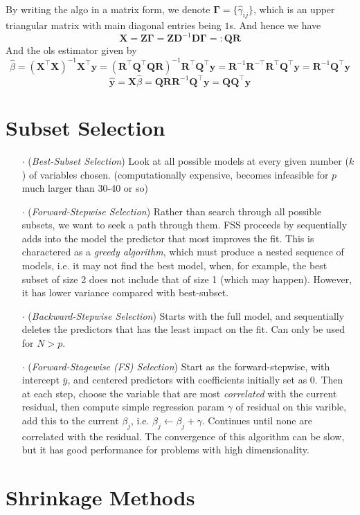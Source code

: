\documentclass[a4paper, 11pt]{article}
\begin{document}
\begin{itemize}
	~\\
	By writing the algo in a matrix form, we denote $\bm{\Gamma}=\{\hat{\gamma}_{ij}\}$, which is an upper triangular matrix with main diagonal entries being $1$s. And hence we have
	$$
	\bm{X} = \bm{Z\Gamma} = \bm{ZD}^{-1} \bm{D\Gamma} =: \bm{QR}
	$$
	And the ols estimator given by
	$$
	\hat{\beta} = (\bm{X}^{\top}\bm{X})^{-1} \bm{X}^{\top} \bm{y} = (\bm{R}^{\top}\bm{Q}^{\top}\bm{QR})^{-1} \bm{R}^{\top} \bm{Q}^{\top} \bm{y} = \bm{R}^{-1} \bm{R}^{-\top} \bm{R}^{\top} \bm{Q}^{\top} \bm{y} = \bm{R}^{-1} \bm{Q}^{\top} \bm{y}
	$$
	$$
	\hat{\bm{y}} = \bm{X}\hat{\beta} = \bm{QR}\bm{R}^{-1} \bm{Q}^{\top} \bm{y} = \bm{Q}\bm{Q}^{\top} \bm{y}
	$$
\end{itemize}


\section{Subset Selection}
\begin{itemize}
	\item[$\cdot$] (\emph{Best-Subset Selection}) Look at all possible models at every given number ($k$) of variables chosen. (computationally expensive, becomes infeasible for $p$ much larger than 30-40 or so)
	\item[$\cdot$] (\emph{Forward-Stepwise Selection}) Rather than search through all possible subsets, we want to seek a path through them. FSS proceeds by sequentially adds into the model the predictor that most improves the fit. This is charactered as a \emph{greedy algorithm}, which must produce a nested sequence of models, i.e. it may not find the best model, when, for example, the best subset of size 2 does not include that of size 1 (which may happen). However, it has lower variance compared with best-subset.
	\item[$\cdot$] (\emph{Backward-Stepwise Selection}) Starts with the full model, and sequentially deletes the predictors that has the least impact on the fit. Can only be used for $N>p$. 
	\item[$\cdot$] (\emph{Forward-Stagewise (FS) Selection}) Start as the forward-stepwise, with intercept $\bar{y}$, and centered predictors with coefficients initially set as $0$. Then at each step, choose the variable that are most \emph{correlated} with the current residual, then compute simple regression param $\gamma$ of residual on this varible, add this to the current $\beta_j$, i.e. $\beta_j \leftarrow \beta_j + \gamma$. Continues until none are correlated with the residual. The convergence of this algorithm can be slow, but it has good performance for problems with high dimensionality.
\end{itemize}

\section{Shrinkage Methods}
\end{document}
